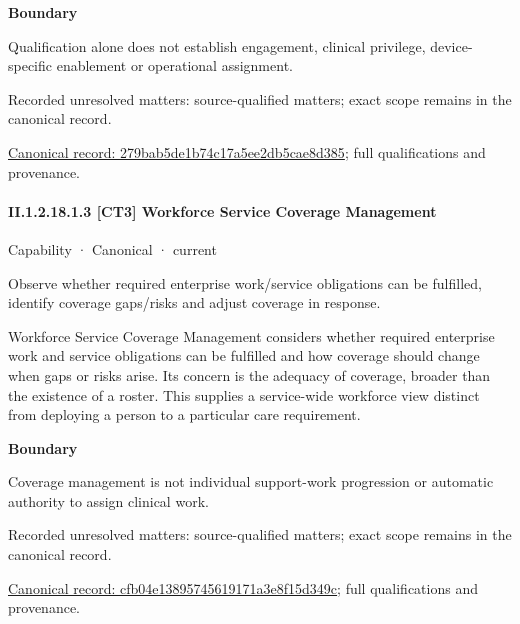 \textbf{Boundary}



Qualification alone does not establish engagement, clinical privilege, device-specific enablement or operational assignment.


{\small Recorded unresolved matters: source-qualified matters; exact scope remains in the canonical record.}\par
{\footnotesize \href{../../../../continuum/strategy/capability/279bab5de1b74c17a5ee2db5cae8d385.md}{Canonical record: 279bab5de1b74c17a5ee2db5cae8d385}; full qualifications and provenance.}\par
\paragraph*{II.1.2.18.1.3 [CT3] Workforce Service Coverage Management}
\label{navigation:II.1.2.18.1.3}

\label{element:cfb04e13895745619171a3e8f15d349c}
{\small Capability · Canonical · current}\par

Observe whether required enterprise work/service obligations can be fulfilled, identify coverage gaps/risks and adjust coverage in response.



Workforce Service Coverage Management considers whether required enterprise work and service obligations can be fulfilled and how coverage should change when gaps or risks arise. Its concern is the adequacy of coverage, broader than the existence of a roster. This supplies a service-wide workforce view distinct from deploying a person to a particular care requirement.



\textbf{Boundary}



Coverage management is not individual support-work progression or automatic authority to assign clinical work.


{\small Recorded unresolved matters: source-qualified matters; exact scope remains in the canonical record.}\par
{\footnotesize \href{../../../../continuum/strategy/capability/cfb04e13895745619171a3e8f15d349c.md}{Canonical record: cfb04e13895745619171a3e8f15d349c}; full qualifications and provenance.}\par

